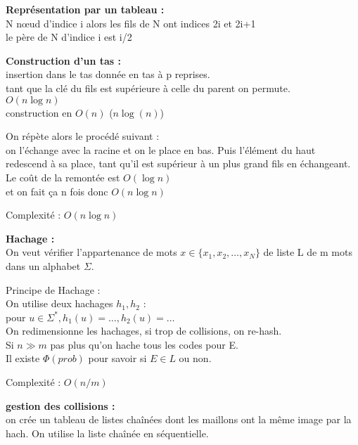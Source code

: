 \documentclass[8pt,a4paper]{extarticle}
\begin{document}
\begin{multicols}{3}
      \columnbreak

      \textbf{Représentation par un tableau :}\\
      N nœud d'indice i alors les fils de N ont indices 2i et 2i+1\\
      le père de N d'indice i est i/2

      \bigskip

      \textbf{Construction d’un tas :}\\
      insertion dans le tas donnée en tas à p reprises.\\
      tant que la clé du fils est supérieure à celle du parent on permute.\\
      \(O(n \log n)\)\\
      construction en \(O(n)\) (\(n \log(n)\))

      On répète alors le procédé suivant :\\
      on l’échange avec la racine et on le place en bas. Puis l’élément du haut redescend à sa place, tant qu’il est supérieur à un plus grand fils en échangeant.\\
      Le coût de la remontée est \(O(\log n)\)\\
      et on fait ça n fois donc \(O(n \log n)\)

      Complexité : \(O(n \log n)\)

      \bigskip

      \textbf{Hachage :}\\
      On veut vérifier l’appartenance de mots \(x \in \{x_1,x_2,\dots,x_N\}\) de liste L de m mots dans un alphabet \(\Sigma\).

      Principe de Hachage :\\
      On utilise deux hachages \(h_1, h_2\) :\\
      pour \(u \in \Sigma^*, h_1(u) = \dots, h_2(u) = \dots\)\\
      On redimensionne les hachages, si trop de collisions, on re-hash.\\
      Si \(n \gg m\) pas plus qu’on hache tous les codes pour E.\\
      Il existe \(\Phi(prob)\) pour savoir si \(E \in L\) ou non.

      Complexité : \(O(n/m)\)

      \bigskip

      \textbf{gestion des collisions :}\\
      on crée un tableau de listes chaînées dont les maillons ont la même image par la hach. On utilise la liste chaînée en séquentielle.\\


\end{multicols}
\end{document}
